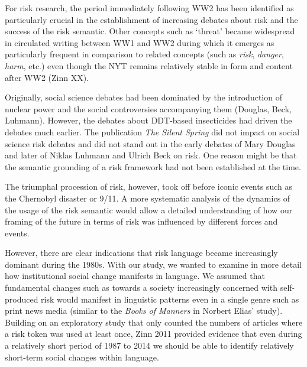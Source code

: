 \documentclass{report}
\begin{document}

For risk research, the period immediately following WW2 has been identified as particularly crucial in the establishment of increasing debates about risk and the success of the risk semantic. Other concepts such as `threat' became widespread in circulated writing between WW1 and WW2 during which it emerges as particularly frequent in comparison to related concepts (such as \emph{risk}, \emph{danger}, \emph{harm}, etc.) even though the NYT remains relatively stable in form and content after WW2 (Zinn XX).

Originally, social science debates had been dominated by the introduction of nuclear power and the social controversies accompanying them (Douglas, Beck, Luhmann). However, the debates about DDT-based insecticides had driven the debates much earlier. The publication \emph{The Silent Spring} did not impact on social science risk debates and did not stand out in the early debates of Mary Douglas and later of Niklas Luhmann and Ulrich Beck on risk. One reason might be that the semantic grounding of a risk framework had not been established at the time. 

The triumphal procession of risk, however, took off before iconic events such as the Chernobyl disaster or 9\slash 11. A more systematic analysis of the dynamics of the usage of the risk semantic would allow a detailed understanding of how our framing of the future in terms of risk was influenced by different forces and events. 

However, there are clear indications that risk language became increasingly dominant during the 1980s. With our study, we wanted to examine in more detail how institutional social change manifests in language. We assumed that fundamental changes such as towards a society increasingly concerned with self-produced risk would manifest in linguistic patterns even in a single genre such as print news media (similar to the \emph{Books of Manners} in Norbert Elias' study). Building on an exploratory study that only counted the numbers of articles where a risk token was used at least once, Zinn 2011 provided evidence that even during a relatively short period of 1987 to 2014 we should be able to identify relatively short-term social changes within language. 


\end{document}
